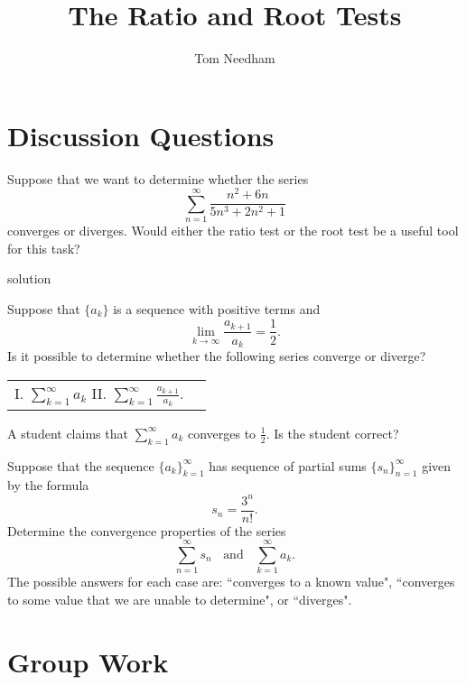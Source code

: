 \documentclass[handout]{ximera}
\author{Tom Needham}
\title[]{The Ratio and Root Tests}
\begin{document}
\begin{abstract}
\end{abstract}
\maketitle

\vspace{-0.5in}

\section{Discussion Questions}

\begin{problem}
Suppose that we want to determine whether the series
$$
\sum_{n=1}^\infty \frac{n^2+6n}{5n^3 + 2n^2 + 1}
$$
converges or diverges. Would either the ratio test or the root test be a useful tool for this task?
\end{problem}

\begin{freeResponse}
solution
\end{freeResponse}

\begin{problem}
Suppose that $\{a_k\}$ is a sequence with positive terms and 
$$
\lim_{k \rightarrow \infty} \frac{a_{k+1}}{a_k} = \frac{1}{2}.
$$
Is it possible to determine whether the following series converge or diverge?
\begin{center}
\begin{tabular}{ll}
I. $\sum_{k=1}^\infty a_k$ \hspace{1in} II. $\sum_{k=1}^\infty \frac{a_{k+1}}{a_k}$.
\end{tabular}
\end{center}
A student claims that $\sum_{k=1}^\infty a_k$ converges to $\frac{1}{2}$. Is the student correct?
\end{problem}

\begin{problem}
Suppose that the sequence $\{a_k\}_{k=1}^\infty$ has sequence of partial sums $\{s_n\}_{n=1}^\infty$ given by the formula
$$
s_n = \frac{3^n}{n!}.
$$
Determine the convergence properties of the series 
$$
\sum_{n=1}^\infty s_n \;\; \mbox{ and } \;\; \sum_{k=1}^\infty a_k. 
$$
The possible answers for each case are: ``converges to a known value", ``converges to some value that we are unable to determine", or ``diverges".
\end{problem}

\section{Group Work}
\end{document}
